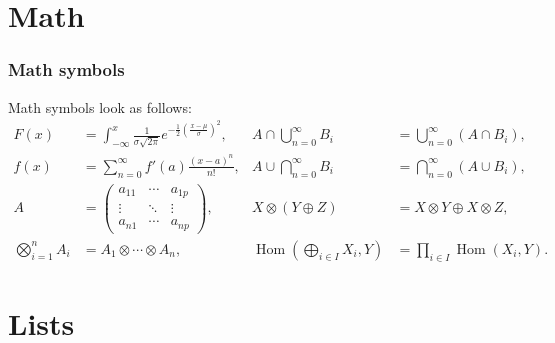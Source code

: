 \documentclass{beamer}
\begin{document}
\section*{Math}

\begin{frame}
    \frametitle{Math symbols}

    Math symbols look as follows:
    \begin{align*}
        F(x)                                                   & =\int_{-\infty}^x\frac{1}{\sigma\sqrt{2\pi}}e^{-\frac{1}{2}\left(\frac{x-\mu}{\sigma}\right)^2}, &
        A\cap\bigcup_{n=0}^\infty B_i                          & =\bigcup_{n=0}^\infty (A\cap B_i),                                                                 \\
        f(x)                                                   & =\sum_{n=0}^\infty f'(a)\frac{(x-a)^n}{n!},                                                      &
        A\cup\bigcap_{n=0}^\infty B_i                          & =\bigcap_{n=0}^\infty (A\cup B_i),                                                                 \\
        A                                                      & = \begin{pmatrix}
                                                                       a_{11} & \cdots & a_{1p} \\
                                                                       \vdots & \ddots & \vdots \\
                                                                       a_{n1} & \cdots & a_{np}
                                                                   \end{pmatrix},                                                                      &
        X\otimes(Y\oplus Z)                                    & =X\otimes Y\oplus X\otimes Z,                                                                      \\
        \bigotimes_{i=1}^nA_i                                  & =A_1\otimes\cdots\otimes A_n,                                                                    &
        \operatorname{Hom}\left(\bigoplus_{i\in I}X_i,Y\right) &
        =\prod_{i\in I}\operatorname{Hom}(X_i,Y).
    \end{align*}

\end{frame}

\section{Lists}
\end{document}
